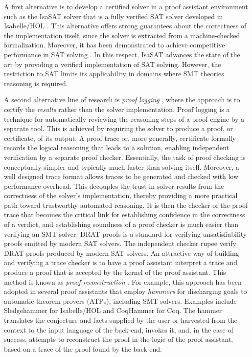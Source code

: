 A first alternative is to develop a certified solver in a proof assistant environment such as the IsaSAT solver \cite{fleury:tel-02963301,fleury:hal-01904647} that is a fully verified SAT solver developed in Isabelle/HOL \cite{isabelle-hol-ref}.
This alternative offers strong guarantees about the correctness of the implementation itself, since the solver is extracted from a machine-checked formalization.
Moreover, it has been demonstrated to achieve competitive performance in SAT solving \cite{EDA-challenge}.
In this respect, IsaSAT advances the state of the art by providing a verified implementation of SAT solving.
However, the restriction to SAT limits its applicability in domains where SMT theories reasoning is required.


A second alternative line of research is \emph{proof logging} \cite{proof-logging}, where the approach is to certify the \emph{results} rather than the solver implementation.
Proof logging is a technique for automatically reviewing the reasoning steps of a proof engine by a separate tool.
This is achieved by requiring the solver to produce a proof, or certificate, of its output.
A proof trace or, more generally, certificate formally records the logical reasoning that leads to a solution, enabling independent verification by a separate proof checker.
Essentially, the task of proof checking is conceptually simpler and typically much faster than solving itself.
Moreover, a well designed trace format allows traces to be generated and checked with low performance overhead.
This decouples the trust in solver results from the correctness of the solver’s implementation, thereby providing a more practical path toward trustworthy automated reasoning.
It is then the checker of the proof trace that becomes the critical link for establishing confidence in the correctness of a verdict, and establishing soundness of a proof checker is much easier than verifying an SMT solver.
DRAT proofs \cite{drat} is a standard for verifying unsatisfiability proofs emitted by modern SAT solvers.
The independent checker rupee \cite{drat-checking} verify DRAT proofs produced by modern SAT solvers.
An attractive way of building and verifying a trace checker is to have a proof assistant interpret a trace and produce a proof that is accepted by the kernel of the proof assistant.
This method is known as \emph{proof reconstruction} \cite{z3recon}.
For example, this approach has been adopted in several proof assistants that employ \emph{hammers} for discharging goals to automatic theorem provers (ATPs), including SMT solvers.
Examples include Sledgehammer \cite{Sledgehammer} for Isabelle/HOL and CoqHammer \cite{coqhammer1,coqhammer2} for Coq.
The hammer translates the conjecture and facts supplied by the user or harvested from the context to the input language of the back-end, invokes it, and, in the case of success, attempts to reconstruct the proof in the logic of the proof assistant, based on a trace of the proof found by the back-end.

